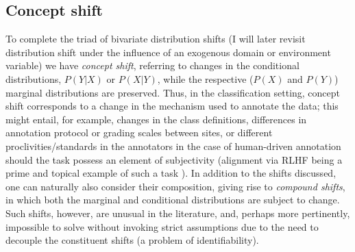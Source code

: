 \subsection{Concept shift}\label{ssec:concept-shift}
To complete the triad of bivariate distribution shifts (I will later revisit distribution shift
under the influence of an exogenous domain or environment variable) we have \emph{concept shift},
referring to changes in the conditional distributions, \( P(Y|X) \) or \( P(X|Y) \), while the
respective (\( P(X) \) and \( P(Y) \)) marginal distributions are preserved.
%
Thus, in the classification setting, concept shift corresponds to a change in the mechanism used to
annotate the data; this might entail, for example, changes in the class definitions, differences in
annotation protocol or grading scales between sites,  or different proclivities/standards in the
annotators in the case of human-driven annotation should the task possess an element of
subjectivity (alignment via \ac{RLHF} being a prime and topical example of such a task
\citep{bai2022training}).
%
In addition to the shifts discussed, one can naturally also consider their composition, giving rise
to \emph{compound shifts}, in which both the marginal and conditional distributions are subject to
change. Such shifts, however, are unusual in the literature, and, perhaps more pertinently,
impossible to solve without invoking strict assumptions due to the need to decouple the constituent
shifts (a problem of identifiability).
%

